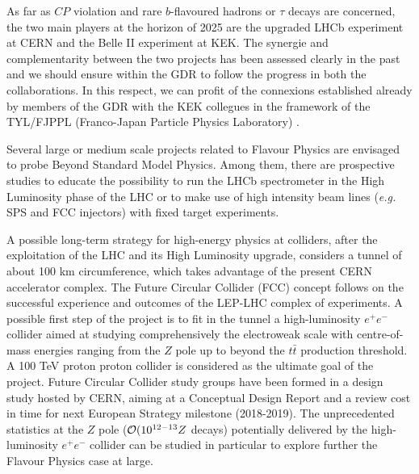 As far as $CP$ violation and rare $b$-flavoured hadrons or $\tau$ decays are concerned, the two main players at the horizon of 2025 are the  upgraded LHCb experiment at CERN and the Belle II experiment at KEK.  The synergie and complementarity between the two projects has been assessed clearly in the past and we should ensure within the GDR to follow the progress in both the collaborations. In this respect, we can profit of the connexions established already by members of the GDR with the KEK collegues in the framework of the TYL/FJPPL (Franco-Japan Particle Physics Laboratory) . 

Several large or medium scale projects related to Flavour Physics are envisaged to probe Beyond Standard Model Physics. Among them, there are prospective studies to educate the possibility to run the LHCb spectrometer in the High Luminosity phase of the LHC or to make use of high intensity beam lines ({\it e.g.} SPS and FCC injectors)  with fixed target experiments.            

A possible long-term strategy for high-energy physics at colliders, after the exploitation of the LHC and its High Luminosity upgrade, considers a tunnel of about 100 km circumference, which takes advantage of the present CERN accelerator complex. The Future Circular Collider (FCC) concept follows on the successful experience and outcomes of the LEP-LHC complex of experiments. A possible first step of the project is to fit in the tunnel a high-luminosity $e^+e^-$ collider aimed at studying comprehensively the electroweak scale with centre-of-mass energies ranging from the $Z$ pole up to beyond the $t \bar t$ production threshold. A  100 TeV proton proton collider is considered as the ultimate goal of the project.  
Future Circular Collider study groups have been formed in a design study hosted by CERN, aiming at a Conceptual Design Report and a review cost in time for next European Strategy milestone (2018-2019). The unprecedented statistics at the $Z$ pole (${\cal O}(10^{12-13} Z$ decays) potentially delivered by the high-luminosity $e^+e^-$ collider can be studied in particular to explore further the Flavour Physics case at large.  


